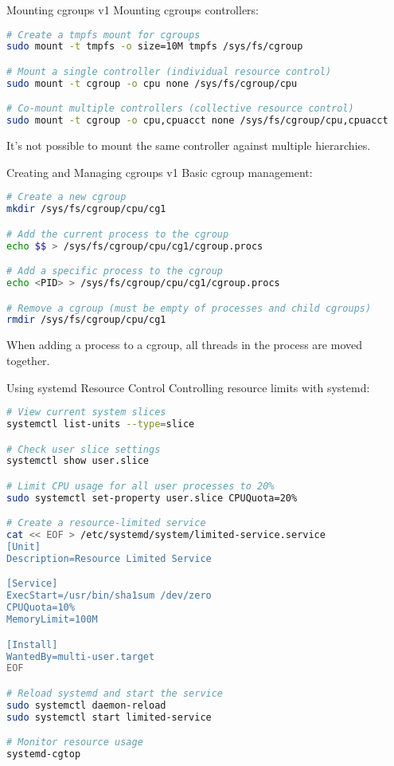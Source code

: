 \begin{code}{Mounting cgroups v1}
    Mounting cgroups controllers:
    
\begin{lstlisting}[language=bash, style=basesmol]
# Create a tmpfs mount for cgroups
sudo mount -t tmpfs -o size=10M tmpfs /sys/fs/cgroup

# Mount a single controller (individual resource control)
sudo mount -t cgroup -o cpu none /sys/fs/cgroup/cpu

# Co-mount multiple controllers (collective resource control)
sudo mount -t cgroup -o cpu,cpuacct none /sys/fs/cgroup/cpu,cpuacct
\end{lstlisting}

    It's not possible to mount the same controller against multiple hierarchies.
\end{code}

\begin{code}{Creating and Managing cgroups v1}
    Basic cgroup management:
    
\begin{lstlisting}[language=bash, style=basesmol]
# Create a new cgroup
mkdir /sys/fs/cgroup/cpu/cg1

# Add the current process to the cgroup
echo $$ > /sys/fs/cgroup/cpu/cg1/cgroup.procs

# Add a specific process to the cgroup
echo <PID> > /sys/fs/cgroup/cpu/cg1/cgroup.procs

# Remove a cgroup (must be empty of processes and child cgroups)
rmdir /sys/fs/cgroup/cpu/cg1
\end{lstlisting}

    When adding a process to a cgroup, all threads in the process are moved together.
\end{code}

\begin{example2}{Using systemd Resource Control}
    Controlling resource limits with systemd:
    
\begin{lstlisting}[language=bash, style=basesmol]
# View current system slices
systemctl list-units --type=slice

# Check user slice settings
systemctl show user.slice

# Limit CPU usage for all user processes to 20%
sudo systemctl set-property user.slice CPUQuota=20%

# Create a resource-limited service
cat << EOF > /etc/systemd/system/limited-service.service
[Unit]
Description=Resource Limited Service

[Service]
ExecStart=/usr/bin/sha1sum /dev/zero
CPUQuota=10%
MemoryLimit=100M

[Install]
WantedBy=multi-user.target
EOF

# Reload systemd and start the service
sudo systemctl daemon-reload
sudo systemctl start limited-service

# Monitor resource usage
systemd-cgtop
\end{lstlisting}
\end{example2}

